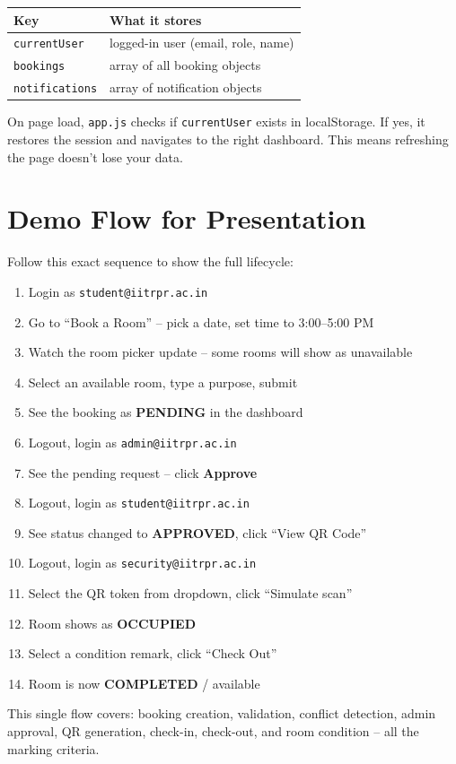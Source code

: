 \documentclass[12pt,a4paper]{article}
\begin{document}
\begin{center}
\begin{tabular}{|l|l|}
\hline
\textbf{Key} & \textbf{What it stores} \\
\hline
\texttt{currentUser} & logged-in user (email, role, name) \\
\texttt{bookings} & array of all booking objects \\
\texttt{notifications} & array of notification objects \\
\hline
\end{tabular}
\end{center}

On page load, \texttt{app.js} checks if \texttt{currentUser} exists in localStorage. If yes, it restores the session and navigates to the right dashboard. This means refreshing the page doesn't lose your data.

\section{Demo Flow for Presentation}

Follow this exact sequence to show the full lifecycle:

\begin{enumerate}
  \item Login as \texttt{student@iitrpr.ac.in}
  \item Go to ``Book a Room'' -- pick a date, set time to 3:00--5:00 PM
  \item Watch the room picker update -- some rooms will show as unavailable
  \item Select an available room, type a purpose, submit
  \item See the booking as \textbf{PENDING} in the dashboard
  \item Logout, login as \texttt{admin@iitrpr.ac.in}
  \item See the pending request -- click \textbf{Approve}
  \item Logout, login as \texttt{student@iitrpr.ac.in}
  \item See status changed to \textbf{APPROVED}, click ``View QR Code''
  \item Logout, login as \texttt{security@iitrpr.ac.in}
  \item Select the QR token from dropdown, click ``Simulate scan''
  \item Room shows as \textbf{OCCUPIED}
  \item Select a condition remark, click ``Check Out''
  \item Room is now \textbf{COMPLETED} / available
\end{enumerate}

This single flow covers: booking creation, validation, conflict detection, admin approval, QR generation, check-in, check-out, and room condition -- all the marking criteria.
\end{document}
